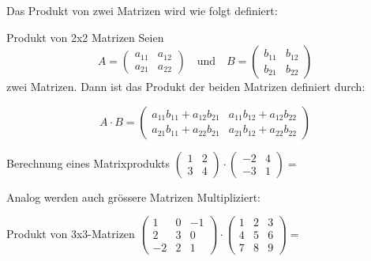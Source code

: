 Das Produkt von zwei Matrizen wird wie folgt definiert:
\begin{definition}
    {Produkt von 2x2 Matrizen}{}
    Seien 
    \[
    A = \begin{pmatrix} a_{11} & a_{12} \\ a_{21} & a_{22} \end{pmatrix}
    \quad \text{und} \quad
    B = \begin{pmatrix} b_{11} & b_{12} \\ b_{21} & b_{22} \end{pmatrix}
    \]
    zwei Matrizen. Dann ist das Produkt der beiden Matrizen definiert durch:

    \[
    A \cdot B =
    \begin{pmatrix} 
    a_{11} b_{11} + a_{12} b_{21} & a_{11} b_{12} + a_{12} b_{22} \\ 
    a_{21} b_{11} + a_{22} b_{21} & a_{21} b_{12} + a_{22} b_{22}
    \end{pmatrix}
    \]

\end{definition}

\begin{bsp}
    {Berechnung eines Matrixprodukts}{}
    \vspace*{1cm}
    \(
\begin{pmatrix} 1 & 2 \\ 3 & 4 \end{pmatrix} 
\cdot 
\begin{pmatrix} -2 & 4 \\ -3 & 1 \end{pmatrix} = 
\)
\vspace*{1cm}
\end{bsp}

Analog werden auch grössere Matrizen Multipliziert:

\begin{bsp}
    {Produkt von 3x3-Matrizen}{}
    \vspace*{1cm}
    $
    \begin{pmatrix} 1 & 0 & -1 \\ 2 & 3 & 0 \\ -2 & 2 & 1 \end{pmatrix} 
    \cdot 
    \begin{pmatrix} 1 & 2 & 3 \\ 4 & 5 & 6 \\ 7 & 8 & 9 \end{pmatrix} =
    $
    \vspace*{1cm}
\end{bsp}

